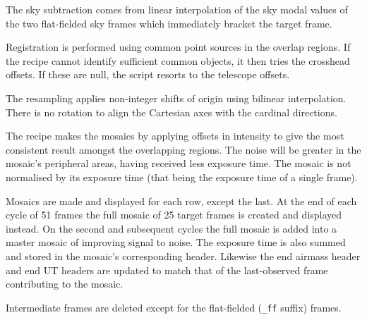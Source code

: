 \documentclass[twoside,11pt,nolof]{starlink}
\begin{document}
{{{         \sstitem
         The sky subtraction comes from linear interpolation of the sky
         modal values of the two flat-fielded sky frames which immediately
         bracket the target frame.

         \sstitem
         Registration is performed using common point sources in the
         overlap regions.  If the recipe cannot identify sufficient common
         objects, it then tries the crosshead offsets.  If these are null,
         the script resorts to the telescope offsets.

         \sstitem
         The resampling applies non-integer shifts of origin using
         bilinear interpolation.  There is no rotation to align the
         Cartesian axes with the cardinal directions.

         \sstitem
         The recipe makes the mosaics by applying offsets in intensity
         to give the most consistent result amongst the overlapping regions.
         The noise will be greater in the mosaic's peripheral areas, having
         received less exposure time.  The mosaic is not normalised by its
         exposure time (that being the exposure time of a single frame).

         \sstitem
         Mosaics are made and displayed for each row, except the last.
         At the end of each cycle of 51 frames the full mosaic of 25 target
         frames is created and displayed instead.  On the second and
         subsequent cycles the full mosaic is added into a master mosaic of
         improving signal to noise.  The exposure time is also summed and
         stored in the mosaic's corresponding header.  Likewise the end
         airmass header and end UT headers are updated to match that of
         the last-observed frame contributing to the mosaic.

         \sstitem
         Intermediate frames are deleted except for the flat-fielded ({\tt\_ff}
         suffix) frames.
      }
   }
   }
\end{document}
